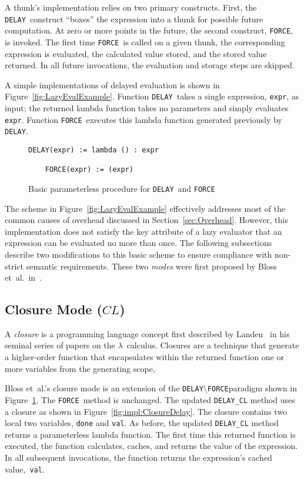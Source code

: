 \documentclass[11pt]{article}
\newcommand{\Delay}{\texttt{DELAY}}
\newcommand{\Force}{\texttt{FORCE}}
\begin{document}
A thunk's implementation relies on two primary constructs.  First, the \Delay\ construct ``boxes'' the expression into a thunk for possible future computation.  At zero or more points in the future, the second construct, \Force, is invoked.  The first time \Force\ is called on a given thunk, the corresponding expression is evaluated, the calculated value stored, and the stored value returned.  In all future invocations, the evaluation and storage steps are skipped.

A simple implementations of delayed evaluation is shown in Figure~\ref{fig:LazyEvalExample}.  Function \Delay\ takes a single expression, \texttt{expr}, as input; the returned lambda function takes no parameters and simply evaluates \texttt{expr}. Function \Force\ executes this lambda function generated previously by \Delay.

\begin{figure}[ht]
  \begin{lstlisting}[]
    DELAY(expr) := lambda () : expr

    FORCE(expr) := (expr)
  \end{lstlisting}
  \caption{Basic parameterless procedure for \Delay\ and \Force}
  \label{fig:impl:DelayForceBase}
\end{figure}

The scheme in Figure~\ref{fig:LazyEvalExample} effectively addresses most of the common causes of overhead discussed in Section~\ref{sec:Overhead}.  However, this implementation does not satisfy the key attribute of a lazy evaluator that an expression can be evaluated no more than once. The following subsections describe two modifications to this basic scheme to ensure compliance with non-strict semantic requirements.  These two \textit{modes} were first proposed by Bloss et~al.\ in~\cite{Bloss:1988}.

\subsection{Closure Mode ($CL$)}\label{sec:ClosureMode}

A \textit{closure} is a programming language concept first described by Landen~\cite{Landen:1964} in his seminal series of papers on the $\lambda$~calculus.  Closures are a technique that generate a higher-order function that encapsulates within the returned function one or more variables from the generating scope,

Bloss et~al.'s closure mode is an extension of the \Delay\textbackslash\Force paradigm shown in Figure~\ref{fig:impl:DelayForceBase}.  The \Force\ method is unchanged. The updated \Delay\texttt{\_CL} method uses a closure as shown in Figure~\ref{fig:impl:ClosureDelay}.  The closure contains two local two variables, \texttt{done} and \texttt{val}.  As before, the updated \Delay\texttt{\_CL} method returns a parameterless lambda function. The first time this returned function is executed, the function calculates, caches, and returns the value of the expression.  In all subsequent invocations, the function returns the expression's cached value,~\texttt{val}.
\end{document}
